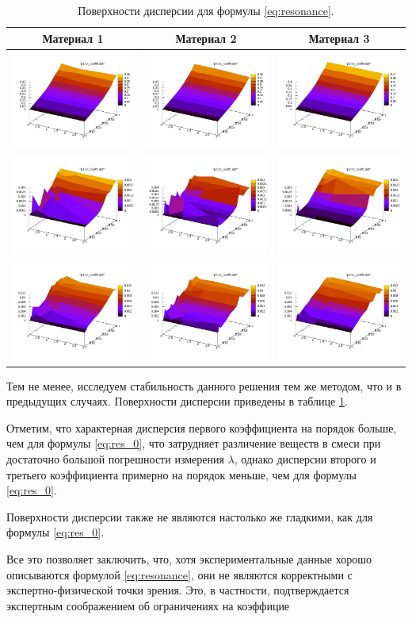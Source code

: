 \documentclass[12pt,a4paper]{article}
\begin{document}
\begin{table}[h]
  \centering
  \begin{tabular}{c c c}
	Материал 1 & Материал 2 & Материал 3 \\ \hline
	\includegraphics[scale=0.25]{figs/resonance/p1.txt_coeff0.dat.pdf} & \includegraphics[scale=0.25]{figs/resonance/p2.txt_coeff0.dat.pdf} & \includegraphics[scale=0.25]{figs/resonance/p3.txt_coeff0.dat.pdf} \\
	\includegraphics[scale=0.25]{figs/resonance/p1.txt_coeff1.dat.pdf} & \includegraphics[scale=0.25]{figs/resonance/p2.txt_coeff1.dat.pdf} & \includegraphics[scale=0.25]{figs/resonance/p3.txt_coeff1.dat.pdf} \\
	\includegraphics[scale=0.25]{figs/resonance/p1.txt_coeff2.dat.pdf} & \includegraphics[scale=0.25]{figs/resonance/p2.txt_coeff2.dat.pdf} & \includegraphics[scale=0.25]{figs/resonance/p3.txt_coeff2.dat.pdf}
  \end{tabular}
  \caption{Поверхности дисперсии для формулы \eqref{eq:resonance}.}
  \label{tabl:res_resonance}
\end{table}

Тем не менее, исследуем стабильность данного решения тем же методом, что и в
предыдущих случаях. Поверхности дисперсии приведены в таблице \ref{tabl:res_resonance}.

Отметим, что характерная дисперсия первого коэффициента на порядок больше, чем
для формулы \eqref{eq:res_0}, что затрудняет различение веществ в смеси при
достаточно большой погрешности измерения $\lambda$, однако дисперсии второго и
третьего коэффициента примерно на порядок меньше, чем для формулы
\eqref{eq:res_0}.

Поверхности дисперсии также не являются настолько же гладкими, как для формулы
\eqref{eq:res_0}.

Все это позволяет заключить, что, хотя экспериментальные данные хорошо
описываются формулой \eqref{eq:resonance}, они не являются корректными с
экспертно-физической точки зрения. Это, в частности, подтверждается экспертным
соображением об ограничениях на коэффицие
\end{document}
